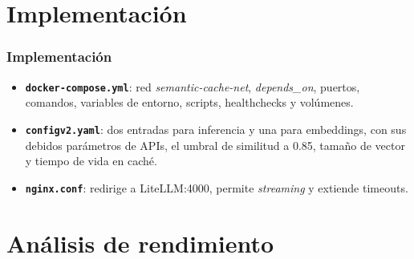 \section{Implementación}
\begin{frame}
\frametitle{Implementación}
\begin{itemize}
    \item \textbf{\texttt{docker-compose.yml}}: red \emph{semantic-cache-net}, \emph{depends\_on}, puertos, comandos, variables de entorno, scripts, healthchecks y volúmenes.

    \item \textbf{\texttt{configv2.yaml}}: dos entradas para inferencia y una para embeddings, con sus debidos parámetros de APIs, el umbral de similitud a 0.85, tamaño de vector y tiempo de vida en caché.

    \item \textbf{\texttt{nginx.conf}}: redirige a LiteLLM:4000, permite \emph{streaming} y extiende timeouts.
\end{itemize}

\end{frame}

\section{Análisis de rendimiento}
